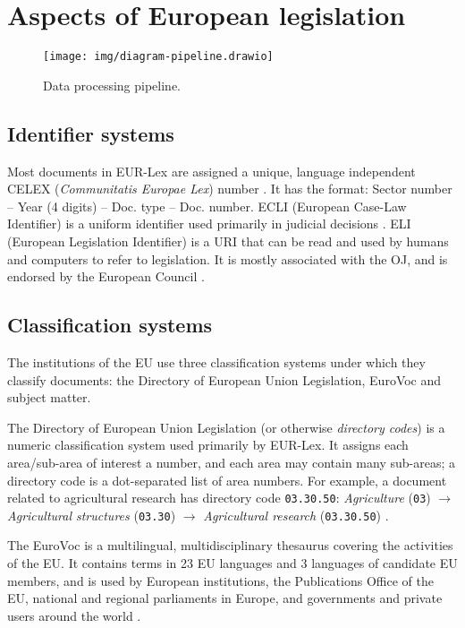 \documentclass[sigconf, authorversion]{acmart}
\begin{document}
\section{Aspects of European legislation}

\begin{figure*}[b]
  \texttt{[image: img/diagram-pipeline.drawio]}
  \caption{Data processing pipeline.}
\end{figure*}

\subsection{Identifier systems}

Most documents in EUR-Lex are assigned a unique, language independent CELEX (\textit{Communitatis Europae Lex}) number \cite{celex}. It has the format: Sector number -- Year (4 digits) -- Doc. type -- Doc. number.
ECLI (European Case-Law Identifier) is a uniform identifier used primarily in judicial decisions \cite{ecli}.
ELI (European Legislation Identifier) is a URI that can be read and used by humans and computers to refer to legislation. It is mostly associated with the OJ, and is endorsed by the European Council \cite{eli}.

\subsection{Classification systems}

The institutions of the EU use three classification systems under which they classify documents: the Directory of European Union Legislation, EuroVoc and subject matter.

The Directory of European Union Legislation (or otherwise \textit{directory codes}) is a numeric classification system used primarily by EUR-Lex. It assigns each area/sub-area of interest a number, and each area may contain many sub-areas; a directory code is a dot-separated list of area numbers. For example, a document related to agricultural research has directory code \texttt{03.30.50}: \textit{Agriculture} (\texttt{03}) $\rightarrow$ \textit{Agricultural structures} (\texttt{03.30}) $\rightarrow$ \textit{Agricultural research} (\texttt{03.30.50}) \cite{directory-legal-acts}.

The EuroVoc is a multilingual, multidisciplinary thesaurus covering the activities of the EU. It contains terms in 23 EU languages and 3 languages of candidate EU members, and is used by European institutions, the Publications Office of the EU, national and regional parliaments in Europe, and governments and private users around the world \cite{eurovoc}.
\end{document}
